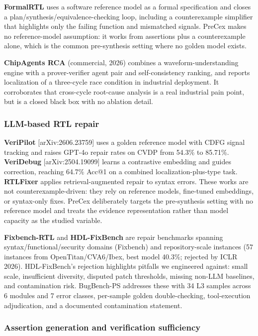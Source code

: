 \documentclass[
  11pt,
]{article}
\begin{document}
\textbf{FormalRTL} uses a software reference model as a formal specification and closes a plan/synthesis/equivalence-checking loop, including a counterexample simplifier that highlights only the failing function and mismatched signals. PreCex makes no reference-model assumption: it works from assertions plus a counterexample alone, which is the common pre-synthesis setting where no golden model exists.

\textbf{ChipAgents RCA} (commercial, 2026) combines a waveform-understanding engine with a prover-verifier agent pair and self-consistency ranking, and reports localization of a three-cycle race condition in industrial deployment. It corroborates that cross-cycle root-cause analysis is a real industrial pain point, but is a closed black box with no ablation detail.

\subsubsection{LLM-based RTL repair}\label{llm-based-rtl-repair}

\textbf{VeriPilot} {[}arXiv:2606.23759{]} uses a golden reference model with CDFG signal tracking and raises GPT-4o repair rates on CVDP from 54.3\% to 85.71\%. \textbf{VeriDebug} {[}arXiv:2504.19099{]} learns a contrastive embedding and guides correction, reaching 64.7\% Acc@1 on a combined localization-plus-type task. \textbf{RTLFixer} applies retrieval-augmented repair to syntax errors. These works are not counterexample-driven: they rely on reference models, fine-tuned embeddings, or syntax-only fixes. PreCex deliberately targets the pre-synthesis setting with no reference model and treats the evidence representation rather than model capacity as the studied variable.

\textbf{Fixbench-RTL} and \textbf{HDL-FixBench} are repair benchmarks spanning syntax/functional/security domains (Fixbench) and repository-scale instances (57 instances from OpenTitan/CVA6/Ibex, best model 40.3\%; rejected by ICLR 2026). HDL-FixBench's rejection highlights pitfalls we engineered against: small scale, insufficient diversity, disputed patch thresholds, missing non-LLM baselines, and contamination risk. BugBench-PS addresses these with 34 L3 samples across 6 modules and 7 error classes, per-sample golden double-checking, tool-execution adjudication, and a documented contamination statement.

\subsubsection{Assertion generation and verification sufficiency}\label{assertion-generation-and-verification-sufficiency}
\end{document}
